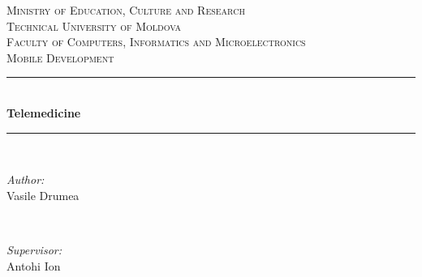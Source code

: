 \begin{titlepage}

  \begin{center} %

  \textsc{\large Ministry of Education, Culture and Research}\\[0.5cm] 
  \textsc{\large Technical University of Moldova}\\[0.5cm] 
  \textsc{\large Faculty of Computers, Informatics and Microelectronics}\\[1.2cm]
  \vspace{40 mm}
  \textsc{\Large Mobile Development}\\[0.3cm] %

  \newcommand{\HRule}{\rule{\linewidth}{0.5mm}} %

  \vspace{10 mm}
  \HRule \\[0.4cm]
  { \LARGE \bfseries Telemedicine }\\[0.4cm] %
  \HRule \\[1.5cm]

      \vspace{50mm}

      \begin{minipage}{0.4\textwidth}
      \begin{flushleft} \large
      \emph{Author:}\\
      Vasile Drumea
      \end{flushleft}
      \end{minipage}
      ~
      \begin{minipage}{0.4\textwidth}
      \begin{flushright} \large
      \emph{Supervisor:} \\
      Antohi Ion %
      \end{flushright}
      \end{minipage}\\[4cm]


\end{center}
\end{titlepage}
